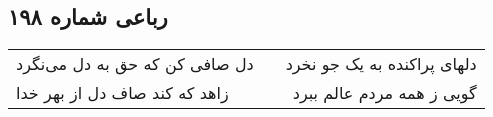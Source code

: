 \begin{center}
\section*{رباعی شماره ۱۹۸}
\label{sec:sh198}
\begin{longtable}{l p{0.5cm} r}
دل صافی کن که حق به دل می‌نگرد
&&
دلهای پراکنده به یک جو نخرد
\\
زاهد که کند صاف دل از بهر خدا
&&
گویی ز همه مردم عالم ببرد
\\
\end{longtable}
\end{center}
